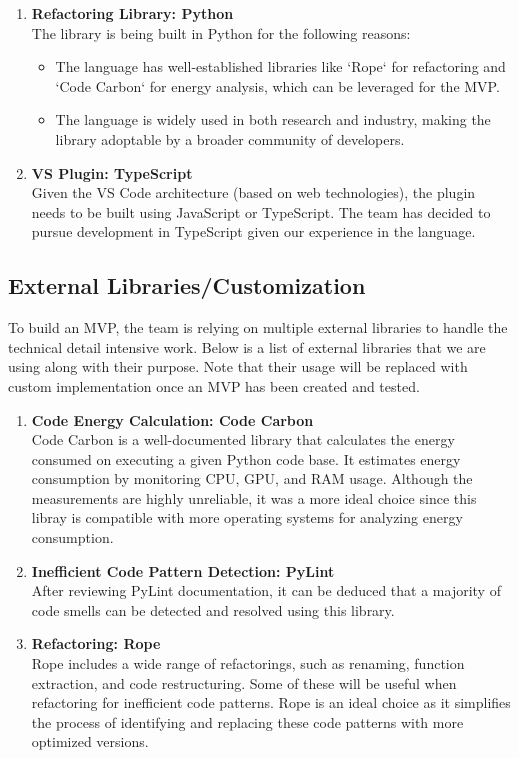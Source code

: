 \documentclass{article}
\begin{document}
\begin{enumerate}
  \item \textbf{Refactoring Library: Python}\\
    The library is being built in Python for the following reasons:
    \begin{itemize}
        \item The language has well-established libraries like `Rope` for refactoring and `Code Carbon` for energy analysis, which can be leveraged for the MVP.
        \item The language is widely used in both research and industry, making the library adoptable by a broader community of developers.
    \end{itemize}
  \item \textbf{VS Plugin: TypeScript}\\
    Given the VS Code architecture (based on web technologies), the
    plugin needs to be built using JavaScript or TypeScript. The team
    has decided to pursue development in TypeScript given our
    experience in the language.
\end{enumerate}

\subsection{External Libraries/Customization}
To build an MVP, the team is relying on multiple external libraries
to handle the technical detail intensive work. Below is a list of
external libraries that we are using along with their purpose. Note
that their usage will be replaced with custom implementation once an
MVP has been created and tested.

\begin{enumerate}
    \item \textbf{Code Energy Calculation: Code Carbon}\\
    Code Carbon is a well-documented library that calculates the energy consumed on executing a given Python code base. It estimates energy consumption by monitoring CPU, GPU, and RAM usage. Although the measurements are highly unreliable, it was a more ideal choice since this libray is compatible with more operating systems for analyzing energy consumption.

    \item \textbf{Inefficient Code Pattern Detection: PyLint}\\
    After reviewing PyLint documentation, it can be deduced that a majority of code smells can be detected and resolved using this library.

  \item \textbf{Refactoring: Rope}\\
    Rope includes a wide range of refactorings, such as renaming,
    function extraction, and code restructuring. Some of these will
    be useful when refactoring for inefficient code patterns. Rope is
    an ideal choice as it simplifies the process of identifying and
    replacing these code patterns with more optimized versions.
\end{enumerate}
\end{document}
